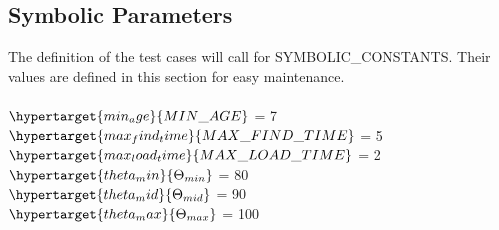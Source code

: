 \documentclass[12pt, titlepage]{article}
\begin{document}
\subsection{Symbolic Parameters}
The definition of the test cases will call for SYMBOLIC\_CONSTANTS. Their values are defined in this section for easy maintenance. \\ \\
$\hypertarget{min_age}{MIN\_AGE}$ = 7 \\
$\hypertarget{max_find_time}{MAX\_FIND\_TIME}$ = 5 \\
$\hypertarget{max_load_time}{MAX\_LOAD\_TIME}$ = 2 \\
$\hypertarget{theta_min}{\Theta_{min}}$ = 80 \\
$\hypertarget{theta_mid}{\Theta_{mid}}$ = 90 \\
$\hypertarget{theta_max}{\Theta_{max}}$ = 100 \\




\end{document}
